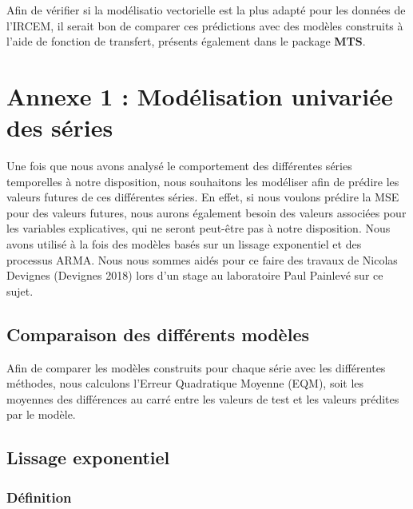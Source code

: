 \documentclass[11pt,]{article}
\begin{document}
Afin de vérifier si la modélisatio vectorielle est la plus adapté pour
les données de l'IRCEM, il serait bon de comparer ces prédictions avec
des modèles construits à l'aide de fonction de transfert, présents
également dans le package \textbf{MTS}.

\newpage

\appendix

\section{\texorpdfstring{Annexe 1 : Modélisation univariée des séries
\label{Annexe1}}{Annexe 1 : Modélisation univariée des séries }}\label{annexe-1-modelisation-univariee-des-series}

Une fois que nous avons analysé le comportement des différentes séries
temporelles à notre disposition, nous souhaitons les modéliser afin de
prédire les valeurs futures de ces différentes séries. En effet, si nous
voulons prédire la MSE pour des valeurs futures, nous aurons également
besoin des valeurs associées pour les variables explicatives, qui ne
seront peut-être pas à notre disposition. Nous avons utilisé à la fois
des modèles basés sur un lissage exponentiel et des processus ARMA. Nous
nous sommes aidés pour ce faire des travaux de Nicolas Devignes
(Devignes 2018) lors d'un stage au laboratoire Paul Painlevé sur ce
sujet.

\subsection{Comparaison des différents
modèles}\label{comparaison-des-differents-modeles}

Afin de comparer les modèles construits pour chaque série avec les
différentes méthodes, nous calculons l'Erreur Quadratique Moyenne (EQM),
soit les moyennes des différences au carré entre les valeurs de test et
les valeurs prédites par le modèle.

\subsection{Lissage exponentiel}\label{lissage-exponentiel}

\subsubsection{Définition}\label{definition}
\end{document}
